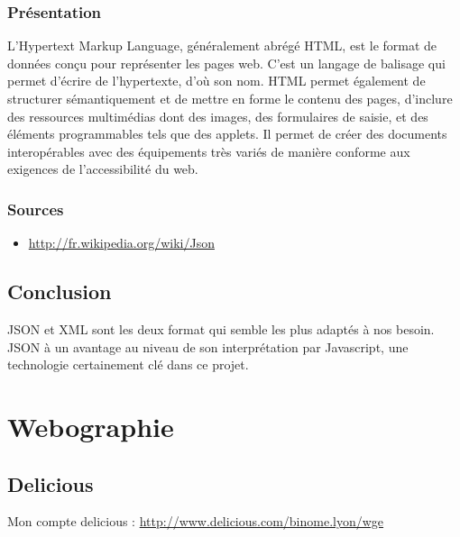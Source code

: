 \documentclass[a4paper,10pt]{report}
\begin{document}
    \subsection{Présentation}

L’Hypertext Markup Language, généralement abrégé HTML, est le format de données 
conçu pour représenter les pages web. C’est un langage de balisage qui permet 
d’écrire de l’hypertexte, d’où son nom. HTML permet également de structurer 
sémantiquement et de mettre en forme le contenu des pages, d’inclure des 
ressources multimédias dont des images, des formulaires de saisie, et des 
éléments programmables tels que des applets. Il permet de créer des documents 
interopérables avec des équipements très variés de manière conforme aux exigences 
de l’accessibilité du web.

    \subsection{Sources}

\begin{itemize}
 \item \url{http://fr.wikipedia.org/wiki/Json}
\end{itemize}

  \section{Conclusion}

JSON et XML sont les deux format qui semble les plus adaptés à nos besoin. 
JSON à un avantage au niveau de son interprétation par Javascript, une 
technologie certainement clé dans ce projet.

\chapter{Webographie}

  \section{Delicious}

Mon compte delicious : \url{http://www.delicious.com/binome.lyon/wge}
\end{document}
